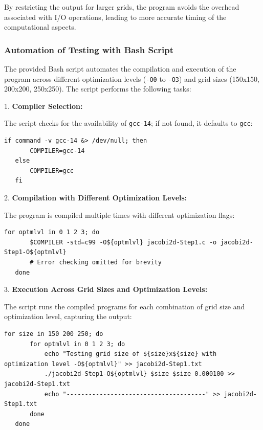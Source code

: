 \documentclass{article}
\begin{document}
By restricting the output for larger grids, the program avoids the overhead associated with I/O operations, leading to more accurate timing of the computational aspects.

\subsubsection{Automation of Testing with Bash Script}

The provided Bash script automates the compilation and execution of the program across different optimization levels (\texttt{-O0} to \texttt{-O3}) and grid sizes (150x150, 200x200, 250x250). The script performs the following tasks:

1. \textbf{Compiler Selection:}

   The script checks for the availability of \texttt{gcc-14}; if not found, it defaults to \texttt{gcc}:

   \begin{lstlisting}[style=BashStyle, caption={Setting Boundary Conditions}]
   if command -v gcc-14 &> /dev/null; then
       COMPILER=gcc-14
   else
       COMPILER=gcc
   fi
   \end{lstlisting}

2. \textbf{Compilation with Different Optimization Levels:}

   The program is compiled multiple times with different optimization flags:

   \begin{lstlisting}[style=BashStyle, caption={Setting Boundary Conditions}]
   for optmlvl in 0 1 2 3; do
       $COMPILER -std=c99 -O${optmlvl} jacobi2d-Step1.c -o jacobi2d-Step1-O${optmlvl}
       # Error checking omitted for brevity
   done
   \end{lstlisting}

3. \textbf{Execution Across Grid Sizes and Optimization Levels:}

   The script runs the compiled programs for each combination of grid size and optimization level, capturing the output:

   \begin{lstlisting}[style=BashStyle, caption={Setting Boundary Conditions}]
   for size in 150 200 250; do
       for optmlvl in 0 1 2 3; do
           echo "Testing grid size of ${size}x${size} with optimization level -O${optmlvl}" >> jacobi2d-Step1.txt
           ./jacobi2d-Step1-O${optmlvl} $size $size 0.000100 >> jacobi2d-Step1.txt
           echo "--------------------------------------" >> jacobi2d-Step1.txt
       done
   done
    \end{lstlisting}
\end{document}
